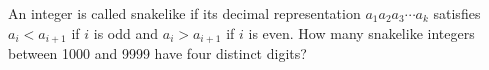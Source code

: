 An integer is called snakelike if its decimal representation $a_1a_2a_3\cdots a_k$ satisfies $a_i<a_{i+1}$ if $i$ is odd and $a_i>a_{i+1}$ if $i$ is even. How many snakelike integers between 1000 and 9999 have four distinct digits?